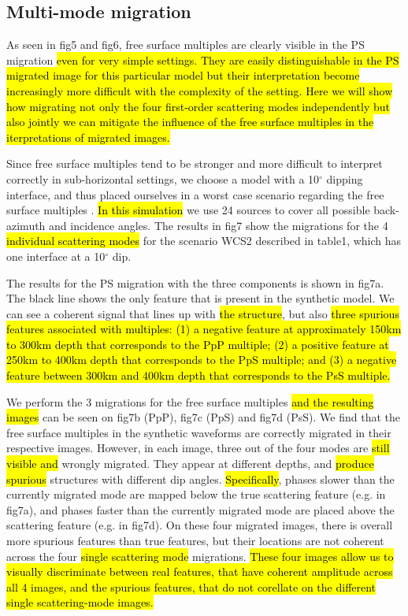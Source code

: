 \documentclass[10pt,a4paper]{article}
\begin{document}
\subsection{Multi-mode migration}

As seen in fig5 and fig6, free surface multiples are clearly visible in the PS migration \hl{even for very simple settings.
They are easily distinguishable in the PS migrated image for this particular model but their interpretation become increasingly more difficult with the complexity of the setting.
Here we will show how migrating not only the four first-order scattering modes independently but also jointly we can mitigate the influence of the free surface multiples in the iterpretations of migrated images.}

Since free surface multiples tend to be stronger and more difficult to interpret correctly in sub-horizontal settings, we choose a model with a 10$^{\circ}$ dipping interface, and thus placed ourselves in a worst case scenario regarding the free surface multiples \citep{cheng_grl_17}.
\hl{In this simulation} we use 24 sources to cover all possible back-azimuth and incidence angles.
The results in fig7 show the migrations for the 4 \hl{individual scattering modes} for the scenario WCS2 described in table1, which has one interface at a 10$^{\circ}$ dip.

The results for the PS migration with the three components is shown in fig7a.
The black line shows the only feature that is present in the synthetic model.
We can see a coherent signal that lines up with \hl{the structure}, but also \hl{three spurious features associated with multiples: (1) a negative feature at approximately 150km to 300km depth that corresponds to the PpP multiple; (2) a positive feature at 250km to 400km depth that corresponds to the PpS multiple; and (3) a negative feature between 300km and 400km depth that corresponds to the PsS multiple.}

We perform the 3 migrations for the free surface multiples \hl{and the resulting images} can be seen on fig7b (PpP), fig7c (PpS) and fig7d (PsS).
We find that the free surface multiples in the synthetic waveforms are correctly migrated in their respective images.
However, in each image, three out of the four modes are \hl{still visible and} wrongly migrated. 
They appear at different depths, and \hl{produce spurious} structures with different dip angles.
\hl{Specifically}, phases slower than the currently migrated mode are mapped below the true scattering feature (e.g. in fig7a), and phases faster than the currently migrated mode are placed above the scattering feature (e.g. in fig7d).
On these four migrated images, there is overall more spurious features than true features, but their locations are not coherent across the four \hl{single scattering mode} migrations.
\hl{These four images allow us to visually discriminate between real features, that have coherent amplitude across all 4 images, and the spurious features, that do not corellate on the different single scattering-mode images.}
\end{document}
